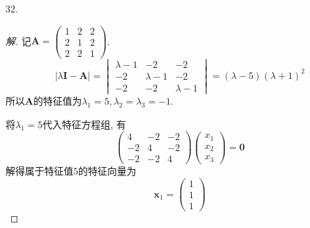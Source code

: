 \documentclass[10pt,a4paper]{report}
\def\*#1{\mathbf{#1}}
\begin{document}
32.
\begin{proof}[解]
	记$\*A = \begin{pmatrix}
	1 & 2 & 2 \\
	2 & 1 & 2 \\
	2 & 2 & 1 
	\end{pmatrix}$.
	\[|\lambda\*I - \*A | = \begin{vmatrix}
	\lambda-1 & -2 & -2 \\
	-2 & \lambda-1 & -2 \\
	-2 & -2 & \lambda-1
	\end{vmatrix} = (\lambda-5)(\lambda+1)^2 \]
	所以$\*A$的特征值为$\lambda_1 = 5, \lambda_2 = \lambda_3 = -1$.
	
	将$\lambda_1 = 5$代入特征方程组, 有
	\[\begin{pmatrix}
	4 & -2 & -2 \\
	-2 & 4 & -2 \\
	-2 & -2 & 4
	\end{pmatrix}\begin{pmatrix}
	x_1 \\
	x_2 \\
	x_3
	\end{pmatrix} = \*0\]
	解得属于特征值$5$的特征向量为
	\[\*x_1 = \begin{pmatrix}
	1 \\
	1 \\
	1
	\end{pmatrix}\]
	

\end{proof}
\end{document}
